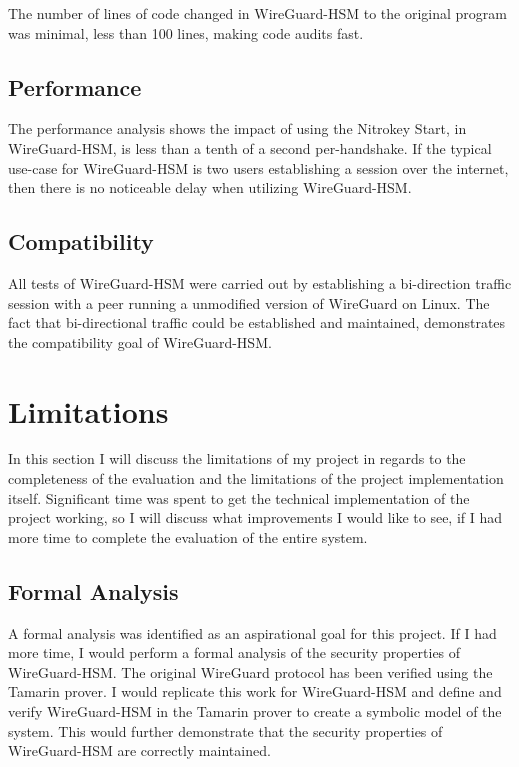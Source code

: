 \documentclass [11pt, proquest] {uwthesis}[2020/02/24]
\begin{document}
The number of lines of code changed in WireGuard-HSM to the original program was minimal, less than 100 lines, making code audits fast.

\subsection{Performance}
The performance analysis shows the impact of using the Nitrokey Start, in WireGuard-HSM, is less than a tenth of a second per-handshake. If the typical use-case for WireGuard-HSM is two users establishing a session over the internet, then there is no noticeable delay when utilizing WireGuard-HSM.

\subsection{Compatibility}
All tests of WireGuard-HSM were carried out by establishing a bi-direction traffic session with a peer running a unmodified version of WireGuard on Linux. The fact that bi-directional traffic could be established and maintained, demonstrates the compatibility goal of WireGuard-HSM. 

\section {Limitations}
In this section I will discuss the limitations of my project in regards to the completeness of the evaluation and the limitations of the project implementation itself. Significant time was spent to get the technical implementation of the project working, so I will discuss what improvements I would like to see, if I had more time to complete the evaluation of the entire system.

\subsection{Formal Analysis}
A formal analysis was identified as an aspirational goal for this project. If I had more time, I would perform a formal analysis of the security properties of WireGuard-HSM. The original WireGuard protocol has been verified using the Tamarin prover\cite{donenfeld_formal_2018}. I would replicate this work for WireGuard-HSM and define and verify WireGuard-HSM in the Tamarin prover to create a symbolic model of the system. This would further demonstrate that the security properties of WireGuard-HSM are correctly maintained.
\end{document}
